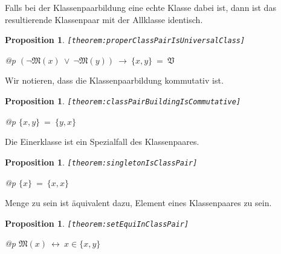 \documentclass[a4paper,german,10pt,twoside]{book}
\newtheorem{prop}[thm]{Proposition}
\theoremstyle{definition}
\theoremstyle{remark}
\begin{document}
\par
Falls bei der Klassenpaarbildung eine echte Klasse dabei ist, dann ist das
resultierende Klassenpaar mit der Allklasse identisch.

\begin{prop}
\label{theorem:properClassPairIsUniversalClass} \hypertarget{theorem:properClassPairIsUniversalClass}{}
{\tt \tiny [\verb]theorem:properClassPairIsUniversalClass]]}
\mbox{}
\begin{longtable}{{@{\extracolsep{\fill}}p{\linewidth}}}
\centering $(\neg \mathfrak{M}(x)\ \lor\ \neg \mathfrak{M}(y))\ \rightarrow\ \{ x, y \} \ = \ \mathfrak{V}$
\end{longtable}

\end{prop}


\par
Wir notieren, dass die Klassenpaarbildung kommutativ ist.

\begin{prop}
\label{theorem:classPairBuildingIsCommutative} \hypertarget{theorem:classPairBuildingIsCommutative}{}
{\tt \tiny [\verb]theorem:classPairBuildingIsCommutative]]}
\mbox{}
\begin{longtable}{{@{\extracolsep{\fill}}p{\linewidth}}}
\centering $\{ x, y \} \ = \ \{ y, x \}$
\end{longtable}

\end{prop}


\par
Die Einerklasse ist ein Spezialfall des Klassenpaares.

\begin{prop}
\label{theorem:singletonIsClassPair} \hypertarget{theorem:singletonIsClassPair}{}
{\tt \tiny [\verb]theorem:singletonIsClassPair]]}
\mbox{}
\begin{longtable}{{@{\extracolsep{\fill}}p{\linewidth}}}
\centering $\{ x \} \ = \ \{ x, x \}$
\end{longtable}

\end{prop}


\par
Menge zu sein ist {\"a}quivalent dazu, Element eines Klassenpaares zu sein.

\begin{prop}
\label{theorem:setEquiInClassPair} \hypertarget{theorem:setEquiInClassPair}{}
{\tt \tiny [\verb]theorem:setEquiInClassPair]]}
\mbox{}
\begin{longtable}{{@{\extracolsep{\fill}}p{\linewidth}}}
\centering $\mathfrak{M}(x)\ \leftrightarrow\ x \in \{ x, y \}$
\end{longtable}

\end{prop}
\end{document}
